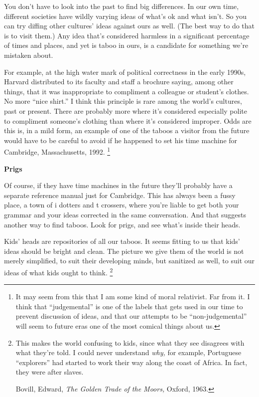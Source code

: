 \documentclass[12pt]{book}
\begin{document}
You don't have to look into the past to find big differences. In our own
time, different societies have wildly varying ideas of what's ok and
what isn't. So you can try diffing other cultures' ideas against ours as
well. (The best way to do that is to visit them.) Any idea that's
considered harmless in a significant percentage of times and places, and
yet is taboo in ours, is a candidate for something we're mistaken about.

For example, at the high water mark of political correctness in the
early 1990s, Harvard distributed to its faculty and staff a brochure
saying, among other things, that it was inappropriate to compliment a
colleague or student's clothes. No more ``nice shirt.'' I think this
principle is rare among the world's cultures, past or present. There are
probably more where it's considered especially polite to compliment
someone's clothing than where it's considered improper. Odds are this
is, in a mild form, an example of one of the taboos a visitor from the
future would have to be careful to avoid if he happened to set his time
machine for Cambridge, Massachusetts, 1992. \footnote{It may seem from this that I am some kind of moral relativist.
Far from it. I think that ``judgemental'' is one of the labels that gets
used in our time to prevent discussion of ideas, and that our attempts
to be ``non-judgemental'' will seem to future eras one of the most
comical things about us.}

\textbf{Prigs}

Of course, if they have time machines in the future they'll probably
have a separate reference manual just for Cambridge. This has always
been a fussy place, a town of i dotters and t crossers, where you're
liable to get both your grammar and your ideas corrected in the same
conversation. And that suggests another way to find taboos. Look for
prigs, and see what's inside their heads.

Kids' heads are repositories of all our taboos. It seems fitting to us
that kids' ideas should be bright and clean. The picture we give them of
the world is not merely simplified, to suit their developing minds, but
sanitized as well, to suit our ideas of what kids ought to think.
\footnote{This makes the world confusing to kids, since what they see
disagrees with what they're told. I could never understand \emph{why,}
for example, Portuguese ``explorers'' had started to work their way
along the coast of Africa. In fact, they were after slaves.

Bovill, Edward, \emph{The Golden Trade of the Moors,} Oxford, 1963.}
\end{document}
